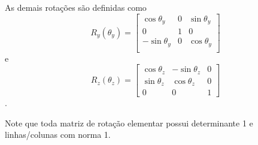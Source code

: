 As demais rotações são definidas como \[
R_y\left( \theta_y \right)  = \begin{bmatrix} 
    \cos\theta_y & 0 & \sin\theta_y \\
    0 & 1 & 0 \\
    - \sin\theta_y & 0 & \cos\theta_y \\
\end{bmatrix} 
\] e \[
R_z\left( \theta_z \right) = \begin{bmatrix} 
    \cos\theta_z & -\sin\theta_z & 0 \\
    \sin\theta_z & \cos\theta_z & 0 \\
    0 & 0 & 1
\end{bmatrix} 
\].

Note que toda matriz de rotação elementar possui determinante 1 e linhas/colunas com norma 1.

